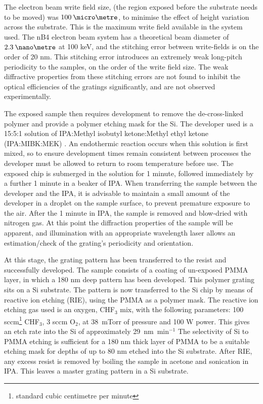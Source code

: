The electron beam write field size, (the region exposed before the substrate needs to be moved) was ${100 \:\micro\metre}$, to minimise the effect of height variation across the substrate. This is the maximum write field available in the system used.
The nB4 electron beam system has a theoretical beam diameter of ${2.3 \:\nano\metre}$ at 100 keV, and the stitching error between write-fields is on the order of 20 nm. This stitching error introduces an extremely weak long-pitch periodicity to the samples, on the order of the write field size. The weak diffractive properties from these stitching errors are not found to inhibit the optical efficiencies of the gratings significantly, and are not observed experimentally.

The exposed sample then requires development to remove the de-cross-linked polymer and provide a polymer etching mask for the Si. The developer used is a 15:5:1 solution of IPA:Methyl isobutyl ketone:Methyl ethyl ketone (IPA:MIBK:MEK) \cite{Bernstein1992}. An endothermic reaction occurs when this solution is first mixed, so to ensure development times remain consistent between processes the developer must be allowed to return to room temperature before use. 
The exposed chip is submerged in the solution for 1 minute, followed immediately by a further 1 minute in a beaker of IPA. When transferring the sample between the developer and the IPA, it is advisable to maintain a small amount of the developer in a droplet on the sample surface, to prevent premature exposure to the air. After the 1 minute in IPA, the sample is removed and blow-dried with nitrogen gas. At this point the diffraction properties of the sample will be apparent, and illumination with an appropriate wavelength laser allows an estimation/check of the grating's periodicity and orientation.

At this stage, the grating pattern has been transferred to the resist and successfully developed. The sample consists of a coating of un-exposed PMMA layer, in which a 180 nm deep pattern has been developed. This polymer grating sits on a Si substrate. The pattern is now transferred to the Si chip by means of reactive ion etching (RIE), using the PMMA as a polymer mask. 
The reactive ion etching gas used is an oxygen, CHF$_3$ mix,  with the following parameters: 100 sccm\footnote{standard cubic centimetre per minute} CHF$_3$, 3 sccm O$_2$, at \mbox{38 mTorr} of pressure and 100 W power. This gives an etch rate into the Si of approximately \mbox{29 nm min$^{-1}$}
The selectivity of Si to PMMA etching is sufficient for a 180 nm thick layer of PMMA to be a suitable etching mask for depths of up to 80 nm etched into the Si substrate. After RIE, any excess resist is removed by boiling the sample in acetone and sonication in IPA. This leaves a master grating pattern in a Si substrate.

